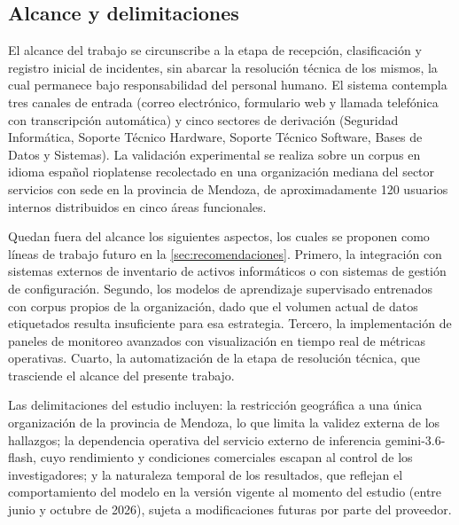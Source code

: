 \subsection{Alcance y delimitaciones}\label{subsec:alcance-delimitaciones}

El alcance del trabajo se circunscribe a la etapa de recepción, clasificación y registro inicial de incidentes, sin abarcar la resolución técnica de los mismos, la cual permanece bajo responsabilidad del personal humano. El sistema contempla tres canales de entrada (correo electrónico, formulario web y llamada telefónica con transcripción automática) y cinco sectores de derivación (Seguridad Informática, Soporte Técnico Hardware, Soporte Técnico Software, Bases de Datos y Sistemas). La validación experimental se realiza sobre un corpus en idioma español rioplatense recolectado en una organización mediana del sector servicios con sede en la provincia de Mendoza, de aproximadamente 120 usuarios internos distribuidos en cinco áreas funcionales.

Quedan fuera del alcance los siguientes aspectos, los cuales se proponen como líneas de trabajo futuro en la \autoref{sec:recomendaciones}. Primero, la integración con sistemas externos de inventario de activos informáticos o con sistemas de gestión de configuración. Segundo, los modelos de aprendizaje supervisado entrenados con corpus propios de la organización, dado que el volumen actual de datos etiquetados resulta insuficiente para esa estrategia. Tercero, la implementación de paneles de monitoreo avanzados con visualización en tiempo real de métricas operativas. Cuarto, la automatización de la etapa de resolución técnica, que trasciende el alcance del presente trabajo.

Las delimitaciones del estudio incluyen: la restricción geográfica a una única organización de la provincia de Mendoza, lo que limita la validez externa de los hallazgos; la dependencia operativa del servicio externo de inferencia gemini-3.6-flash, cuyo rendimiento y condiciones comerciales escapan al control de los investigadores; y la naturaleza temporal de los resultados, que reflejan el comportamiento del modelo en la versión vigente al momento del estudio (entre junio y octubre de 2026), sujeta a modificaciones futuras por parte del proveedor.

\newpage
